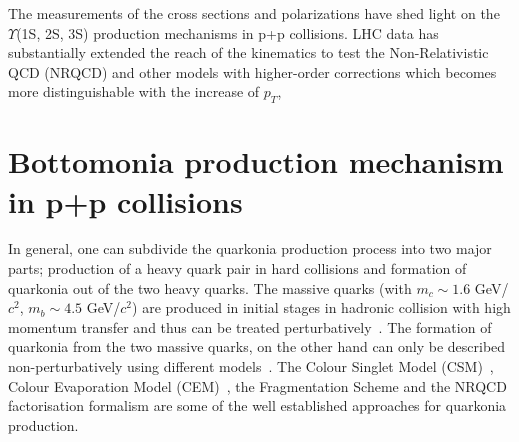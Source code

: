 The measurements of the cross sections and polarizations have shed light on the
$\Upsilon$(1S, 2S, 3S) production mechanisms in p+p collisions.
LHC data has substantially extended the reach of the kinematics to test the
Non-Relativistic QCD (NRQCD) and other models with
higher-order corrections which becomes more
distinguishable with the increase of $p_{T}$,






\section{Bottomonia production mechanism in p+p collisions}
\label{sec:Bottomonia_pp_th}


In general, one can subdivide the quarkonia production process into two major parts;
production of a heavy quark pair in hard collisions and formation of quarkonia
out of the two heavy quarks.
  The massive quarks (with $m_c\sim 1.6$ GeV/$c^2$, $m_b\sim 4.5$ GeV/$c^2$) are produced
in initial stages in hadronic collision with high momentum transfer and thus
can be treated perturbatively~\cite{Nason:1989zy}. The formation of quarkonia
from the two massive quarks, on the other hand can only be described non-perturbatively using different
models~\cite{Bodwin:1994jh,Brambilla:2014jmp}.
The Colour Singlet Model (CSM)~\cite{Einhorn:1975ua,Berger:1980ni},
Colour Evaporation Model (CEM)~\cite{Fritzsch:1977ay,Amundson:1995em}, the Fragmentation Scheme and 
the NRQCD factorisation formalism are some of the well established approaches for quarkonia production.


